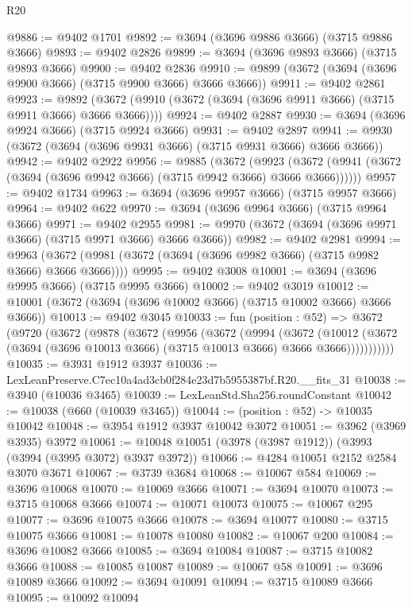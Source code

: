 \begin{lexlean}{R20}
\begin{coremodule}
@9886 := @9402 @1701
@9892 := @3694 (@3696 @9886 @3666) (@3715 @9886 @3666)
@9893 := @9402 @2826
@9899 := @3694 (@3696 @9893 @3666) (@3715 @9893 @3666)
@9900 := @9402 @2836
@9910 := @9899 (@3672 (@3694 (@3696 @9900 @3666) (@3715 @9900 @3666) @3666 @3666))
@9911 := @9402 @2861
@9923 := @9892 (@3672 (@9910 (@3672 (@3694 (@3696 @9911 @3666) (@3715 @9911 @3666) @3666 @3666))))
@9924 := @9402 @2887
@9930 := @3694 (@3696 @9924 @3666) (@3715 @9924 @3666)
@9931 := @9402 @2897
@9941 := @9930 (@3672 (@3694 (@3696 @9931 @3666) (@3715 @9931 @3666) @3666 @3666))
@9942 := @9402 @2922
@9956 := @9885
    (@3672
      (@9923 (@3672 (@9941 (@3672 (@3694 (@3696 @9942 @3666) (@3715 @9942 @3666) @3666 @3666))))))
@9957 := @9402 @1734
@9963 := @3694 (@3696 @9957 @3666) (@3715 @9957 @3666)
@9964 := @9402 @622
@9970 := @3694 (@3696 @9964 @3666) (@3715 @9964 @3666)
@9971 := @9402 @2955
@9981 := @9970 (@3672 (@3694 (@3696 @9971 @3666) (@3715 @9971 @3666) @3666 @3666))
@9982 := @9402 @2981
@9994 := @9963 (@3672 (@9981 (@3672 (@3694 (@3696 @9982 @3666) (@3715 @9982 @3666) @3666 @3666))))
@9995 := @9402 @3008
@10001 := @3694 (@3696 @9995 @3666) (@3715 @9995 @3666)
@10002 := @9402 @3019
@10012 := @10001 (@3672 (@3694 (@3696 @10002 @3666) (@3715 @10002 @3666) @3666 @3666))
@10013 := @9402 @3045
@10033 := fun (position : @52) =>
  @3672
    (@9720
      (@3672
        (@9878
          (@3672
            (@9956
              (@3672
                (@9994
                  (@3672
                    (@10012
                      (@3672 (@3694 (@3696 @10013 @3666) (@3715 @10013 @3666) @3666 @3666)))))))))))
@10035 := @3931 @1912 @3937
@10036 := LexLeanPreserve.C7ec10a4ad3cb0f284e23d7b5955387bf.R20.__fits_31
@10038 := @3940 (@10036 @3465)
@10039 := LexLeanStd.Sha256.roundConstant
@10042 := @10038 (@660 (@10039 @3465))
@10044 := (position : @52) -> @10035 @10042
@10048 := @3954 @1912 @3937 @10042 @3072
@10051 := @3962 (@3969 @3935) @3972
@10061 := @10048 @10051 (@3978 (@3987 @1912)) (@3993 (@3994 (@3995 @3072) @3937 @3972))
@10066 := @4284 @10051 @2152 @2584 @3070 @3671
@10067 := @3739 @3684
@10068 := @10067 @584
@10069 := @3696 @10068
@10070 := @10069 @3666
@10071 := @3694 @10070
@10073 := @3715 @10068 @3666
@10074 := @10071 @10073
@10075 := @10067 @295
@10077 := @3696 @10075 @3666
@10078 := @3694 @10077
@10080 := @3715 @10075 @3666
@10081 := @10078 @10080
@10082 := @10067 @200
@10084 := @3696 @10082 @3666
@10085 := @3694 @10084
@10087 := @3715 @10082 @3666
@10088 := @10085 @10087
@10089 := @10067 @58
@10091 := @3696 @10089 @3666
@10092 := @3694 @10091
@10094 := @3715 @10089 @3666
@10095 := @10092 @10094

\end{coremodule}
\end{lexlean}
